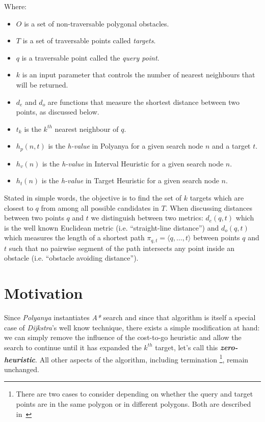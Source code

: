 \noindent Where:
\begin{itemize}[leftmargin=+1cm]
\item $O$ is a set of non-traversable polygonal obstacles.
\item $T$ is a set of traversable points called \emph{targets}.
\item $q$ is a traversable point called the \emph{query point}.
\item $k$ is an input parameter that controls the number of nearest neighbours that will be returned.
\item $d_e$ and $d_o$ are functions that measure the shortest distance between two points, as discussed below.
\item $t_k$ is the $k^{th}$ nearest neighbour of $q$.
\item $h_p(n, t)$ is the \textit{h-value} in Polyanya for a given search node $n$ and a target
  $t$.
\item $h_v(n)$ is the \textit{h-value} in Interval Heuristic for a given search node $n$.
\item $h_t(n)$ is the \textit{h-value} in Target Heuristic for a given search node $n$.
\end{itemize}
\noindent
Stated in simple words, the objective is to find the set of $k$ targets which are closest to $q$ from among all possible candidates in $T$.
When discussing distances between two points $q$ and $t$ we distinguish between two metrics:
$d_e(q, t)$ which is the well known Euclidean metric (i.e. ``straight-line distance'')
and $d_o(q, t)$ which measures the length of a shortest path $\pi_{q, t} = \langle q, \ldots, t\rangle$ between points $q$ and $t$ such that
no pairwise segment of the path intersects any point inside an obstacle (i.e. ``obstacle avoiding distance'').


\section{Motivation}\label{mot}
Since \textit{Polyanya} instantiates \textit{A*} search and since that algorithm is itself a
special case of \textit{Dijkstra}'s well know technique, there exists a simple modification at
hand: we can simply remove the influence of the cost-to-go heuristic and allow the search to
continue until it has expanded the $k^{th}$ target, let's call this \textbf{\textit{zero-heuristic}}.
All other aspects of the algorithm, including termination
\footnote{There are two cases to consider depending on whether the query and target points are in the same polygon or in different polygons.
Both are described in~\cite{cuicompromise}}, remain unchanged.

